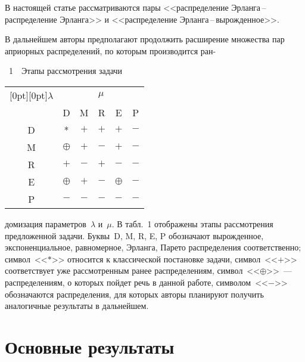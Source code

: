 \begin{multicols}{2}
В настоящей статье рассматриваются пары  <<распределение Эрланга\,--\,распределение Эрланга>> и <<распределение 
Эрланга\,--\,вырожденное>>.

В дальнейшем авторы предполагают продолжить расширение множества пар априорных распределений, по которым производится
ран-\linebreak\vspace*{-12pt}
\columnbreak


\vspace*{-6pt}
\noindent %
\begin{center}
\parbox{60mm}{{\tablename~1}\ \ \small{Этапы рассмотрения задачи}}
\end{center}
\vspace*{2pt}

{\small
\begin{center}
\tabcolsep=10pt
\begin{tabular}{|c|c|c|c|c|c|}
\hline
\multicolumn{1}{|c|}{\raisebox{-4pt}[0pt][0pt]{$\lambda $}}&\multicolumn{5}{c|}{$\mu$}\\
\cline{2-6}
&D&M&R&E&P\\
\hline
D&*&$+$&$+$&$+$&$-$\\
M&$\oplus$&$+$&$-$&$+$&$-$\\
R&$+$&$-$&$+$&$-$&$-$\\
E&$\oplus$&$+$&$-$&$\oplus$&$-$\\
P&$-$&$-$&$-$&$-$&$-$\\
\hline
\end{tabular}
\end{center}
}
\vspace*{12pt}


\bigskip
\addtocounter{table}{1}


\noindent
домизация параметров~$\lambda$ и~$\mu$. В табл.~1 отображены этапы рассмотрения предложенной задачи. Буквы~D, M,
R, E, P обозначают вырожденное, экспоненциальное, равномерное, Эрланга, Парето распределения соответственно; 
символ~<<$*$>> относится к классической постановке задачи, символ~<<$+$>> соответствует уже рассмотренным ранее
распределениям, символ~<<$\oplus$>>~--- распределениям, о которых пойдет речь в данной работе, символом~<<$-$>>
обозначаются распределения, для которых авторы планируют получить аналогичные результаты в дальнейшем.


\section{Основные результаты}


\end{multicols}
